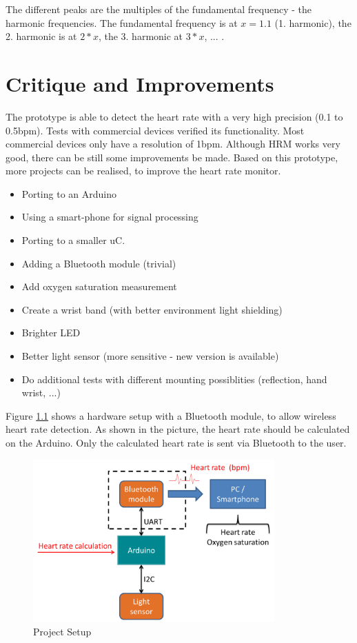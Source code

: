 \documentclass[notitlepage]{scrreprt}
\begin{document}
The different peaks are the multiples of the fundamental frequency - the harmonic frequencies. The fundamental frequency is at $x = 1.1$ (1. harmonic), the 2. harmonic is at $2*x$, the 3. harmonic at $3*x$, ... . 

\chapter{Critique and Improvements}
The prototype is able to detect the heart rate with a very high precision (0.1 to 0.5bpm). Tests with commercial devices verified its functionality. Most commercial devices only have a resolution of 1bpm. Although HRM works very good, there can be still some improvements be made. Based on this prototype, more projects can be realised, to improve the heart rate monitor.

\begin{itemize}
	\item{Porting to an Arduino}
	\item{Using a smart-phone for signal processing}
	\item{Porting to a smaller uC.}
	\item{Adding a Bluetooth module (trivial)}
	\item{Add oxygen saturation measurement}
	\item{Create a wrist band (with better environment light shielding)}
	\item{Brighter LED}
	\item{Better light sensor (more sensitive - new version is available)}
	\item{Do additional tests with different mounting possiblities (reflection, hand wrist, ...)}
\end{itemize}

Figure \ref{fig:data-flow1} shows a hardware setup with a Bluetooth module, to allow wireless heart rate detection. As shown in the picture, the heart rate should be calculated on the Arduino. Only the calculated heart rate is sent via Bluetooth to the user.

\begin{figure}[H]
	\centering
	\includegraphics[width=350px]{images/general_dataFlow_first.png}
	\caption{Project Setup}
	\label{fig:data-flow1}
\end{figure}
\end{document}

